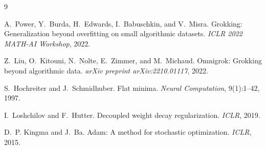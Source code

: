 \documentclass[11pt,a4paper]{article}
\begin{document}

\begin{thebibliography}{9}

A.~Power, Y.~Burda, H.~Edwards, I.~Babuschkin, and V.~Misra.
\newblock Grokking: Generalization beyond overfitting on small algorithmic datasets.
\newblock \emph{ICLR 2022 MATH-AI Workshop}, 2022.

Z.~Liu, O.~Kitouni, N.~Nolte, E.~Zimmer, and M.~Michaud.
\newblock Omnigrok: Grokking beyond algorithmic data.
\newblock \emph{arXiv preprint arXiv:2210.01117}, 2022.

S.~Hochreiter and J.~Schmidhuber.
\newblock Flat minima.
\newblock \emph{Neural Computation}, 9(1):1--42, 1997.

I.~Loshchilov and F.~Hutter.
\newblock Decoupled weight decay regularization.
\newblock \emph{ICLR}, 2019.

D.~P. Kingma and J.~Ba.
\newblock Adam: A method for stochastic optimization.
\newblock \emph{ICLR}, 2015.

\end{thebibliography}
\end{document}
